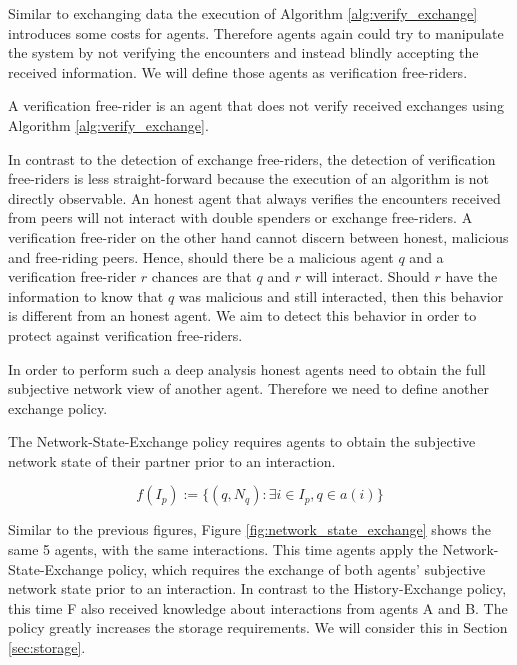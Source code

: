 Similar to exchanging data the execution of Algorithm \ref{alg:verify_exchange} introduces
some costs for agents. Therefore agents again could try to manipulate the system by not verifying 
the encounters and instead blindly accepting the received information. We will define those agents
as verification free-riders.

\begin{defn}
    A verification free-rider is an agent that does not verify received exchanges using Algorithm 
    \ref{alg:verify_exchange}.
\end{defn}

In contrast to the detection of exchange free-riders, the detection of verification free-riders is
less straight-forward because the execution of an algorithm is not directly observable. An honest agent
that always verifies the encounters received from peers will not interact with double spenders or 
exchange free-riders. A verification free-rider on the other hand cannot discern between honest,
malicious and free-riding peers. Hence, should there be a malicious agent $q$ and a verification 
free-rider $r$ chances are that $q$ and $r$ will interact. Should $r$ have the information to know 
that $q$ was malicious and still interacted, then this behavior is different from an honest agent.
We aim to detect this behavior in order to protect against verification free-riders.

In order to perform such a deep analysis honest agents need to obtain the full subjective network 
view of another agent. Therefore we need to define another exchange policy.

\begin{pol}
    \label{pol:network_state}
    The Network-State-Exchange policy requires agents to obtain the subjective network state of their partner 
    prior to an interaction. 

    \[ f(I_p) := \{ (q, N_q) : \exists i \in I_p, q \in a(i) \}\]
\end{pol}

Similar to the previous figures, Figure \ref{fig:network_state_exchange} shows the same 5 agents, 
with the same interactions. This time agents apply the Network-State-Exchange policy, which requires
the exchange of both agents' subjective network state prior to an interaction. In contrast to the 
History-Exchange policy, this time F also received knowledge about interactions from agents A and B.
The policy greatly increases the storage requirements. We will consider this in Section \ref{sec:storage}.

